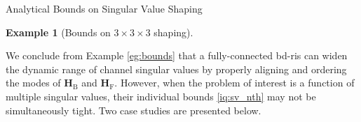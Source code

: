 \documentclass[journal]{IEEEtran}
\DeclareMathOperator{\diag}{diag}
\DeclareMathOperator{\sv}{sv}
\newtheorem{example}{Example}
\begin{document}
\begin{section}{Analytical Bounds on Singular Value Shaping}
\begin{example}[Bounds on $3 \times 3 \times 3$ shaping]

		\end{example}

		We conclude from Example \ref{eg:bounds} that a fully-connected \gls{bd}-\gls{ris} can widen the dynamic range of channel singular values by properly aligning and ordering the modes of $\mathbf{H}_\mathrm{B}$ and $\mathbf{H}_\mathrm{F}$.
		However, when the problem of interest is a function of multiple singular values, their individual bounds \eqref{iq:sv_nth} may not be simultaneously tight.
		Two case studies are presented below.


\end{section}
\end{document}
